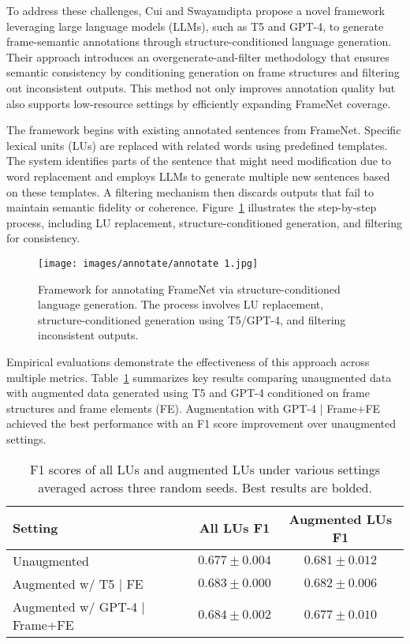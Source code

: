 \documentclass[a4paper, 11pt, twoside, openright]{report}
\begin{document}
To address these challenges, Cui and Swayamdipta propose a novel framework leveraging large language models (LLMs), such as T5 and GPT-4, to generate frame-semantic annotations through structure-conditioned language generation. Their approach introduces an overgenerate-and-filter methodology that ensures semantic consistency by conditioning generation on frame structures and filtering out inconsistent outputs. This method not only improves annotation quality but also supports low-resource settings by efficiently expanding FrameNet coverage.

The framework begins with existing annotated sentences from FrameNet. Specific lexical units (LUs) are replaced with related words using predefined templates. The system identifies parts of the sentence that might need modification due to word replacement and employs LLMs to generate multiple new sentences based on these templates. A filtering mechanism then discards outputs that fail to maintain semantic fidelity or coherence. Figure~\ref{fig:framenet_process} illustrates the step-by-step process, including LU replacement, structure-conditioned generation, and filtering for consistency.

\begin{figure}[h!]
    \centering
    \texttt{[image: images/annotate/annotate 1.jpg]}
    \caption{Framework for annotating FrameNet via structure-conditioned language generation. The process involves LU replacement, structure-conditioned generation using T5/GPT-4, and filtering inconsistent outputs.}
    \label{fig:framenet_process}
\end{figure}

Empirical evaluations demonstrate the effectiveness of this approach across multiple metrics. Table~\ref{tab:framenet_results} summarizes key results comparing unaugmented data with augmented data generated using T5 and GPT-4 conditioned on frame structures and frame elements (FE). Augmentation with GPT-4 | Frame+FE achieved the best performance with an F1 score improvement over unaugmented settings.

\begin{table}[h!]
    \centering
    \begin{tabular}{lcc}
        \hline
        Setting & All LUs F1 & Augmented LUs F1 \\ 
        \hline
        Unaugmented & \(0.677 \pm 0.004\) & \(0.681 \pm 0.012\) \\ 
        Augmented w/ T5 | FE & \(0.683 \pm 0.000\) & \(0.682 \pm 0.006\) \\ 
        Augmented w/ GPT-4 | Frame+FE & \(0.684 \pm 0.002\) & \(0.677 \pm 0.010\) \\ 
        \hline
    \end{tabular}
    \caption{F1 scores of all LUs and augmented LUs under various settings averaged across three random seeds. Best results are bolded.}
    \label{tab:framenet_results}
\end{table}
\end{document}

